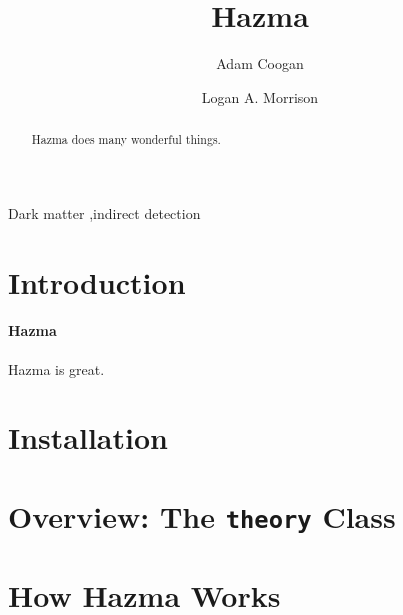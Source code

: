



\begin{frontmatter}

\title{Hazma}

\author[grappa,ucsc,scipp]{Adam Coogan}

\author[ucsc,scipp]{Logan A. Morrison}

\address[grappa]{GRAPPA, Institute of Physics, University of Amsterdam, 1098 XH Amsterdam, The Netherlands}
\address[ucsc]{Department of Physics, 1156 High St., University of California Santa Cruz, Santa Cruz, CA 95064, USA}
\address[scipp]{Santa Cruz Institute for Particle Physics, 1156 High St., Santa Cruz, CA 95064, USA}

\begin{abstract}
    Hazma does many wonderful things.
\end{abstract}

\begin{keyword}
Dark matter \sep indirect detection
\end{keyword}

\end{frontmatter}

\section{Introduction}

\paragraph{Hazma} Hazma is great.

\section{Installation}%
\label{sec:installation}

\section{Overview: The \texttt{theory} Class}%
\label{sec:overview_the_theory_class}



\section{How Hazma Works}%
\label{sec:how_hazma_works}

